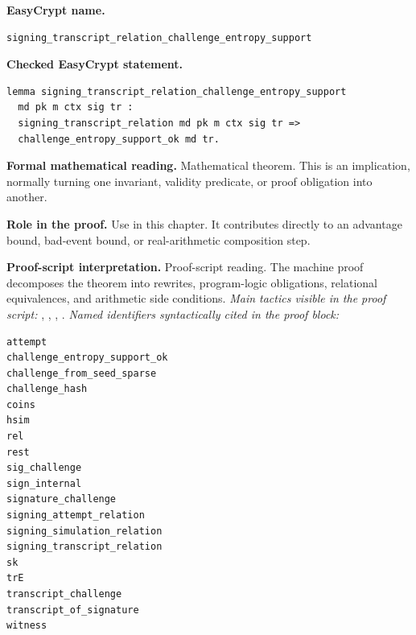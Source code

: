 \begin{formaltheorem}
\noindent\textbf{EasyCrypt name.}
\begin{lstlisting}[language=EasyCrypt,basicstyle=\ttfamily\scriptsize]
signing_transcript_relation_challenge_entropy_support
\end{lstlisting}
\noindent\textbf{Checked EasyCrypt statement.}
\begin{lstlisting}[language=EasyCrypt,basicstyle=\ttfamily\scriptsize]
lemma signing_transcript_relation_challenge_entropy_support
  md pk m ctx sig tr :
  signing_transcript_relation md pk m ctx sig tr =>
  challenge_entropy_support_ok md tr.
\end{lstlisting}
\noindent\textbf{Formal mathematical reading.}
Mathematical theorem. This is an implication, normally turning one invariant, validity predicate, or proof obligation into another.

\noindent\textbf{Role in the proof.}
Use in this chapter. It contributes directly to an advantage bound, bad-event bound, or real-arithmetic composition step.

\noindent\textbf{Proof-script interpretation.}
Proof-script reading. The machine proof decomposes the theorem into rewrites, program-logic obligations, relational equivalences, and arithmetic side conditions.
\emph{Main tactics visible in the proof script:} , , , .
\emph{Named identifiers syntactically cited in the proof block:}
\begin{lstlisting}[language=EasyCrypt,basicstyle=\ttfamily\scriptsize]
attempt
challenge_entropy_support_ok
challenge_from_seed_sparse
challenge_hash
coins
hsim
rel
rest
sig_challenge
sign_internal
signature_challenge
signing_attempt_relation
signing_simulation_relation
signing_transcript_relation
sk
trE
transcript_challenge
transcript_of_signature
witness
\end{lstlisting}

\end{formaltheorem}

